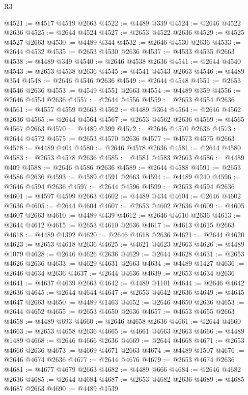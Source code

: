 \begin{lexlean}{R3}
\begin{coremodule}
@4521 := @4517 @4519 @2663
@4522 := @4489 @339
@4524 := @2646 @4522 @2636
@4525 := @2644 @4524
@4527 := @2653 @4522 @2636
@4529 := @4525 @4527 @2663
@4530 := @4489 @344
@4532 := @2646 @4530 @2636
@4533 := @2644 @4532
@4535 := @2653 @4530 @2636
@4537 := @4533 @4535 @2663
@4538 := @4489 @349
@4540 := @2646 @4538 @2636
@4541 := @2644 @4540
@4543 := @2653 @4538 @2636
@4545 := @4541 @4543 @2663
@4546 := @4489 @354
@4548 := @2646 @4546 @2636
@4549 := @2644 @4548
@4551 := @2653 @4546 @2636
@4553 := @4549 @4551 @2663
@4554 := @4489 @359
@4556 := @2646 @4554 @2636
@4557 := @2644 @4556
@4559 := @2653 @4554 @2636
@4561 := @4557 @4559 @2663
@4562 := @4489 @364
@4564 := @2646 @4562 @2636
@4565 := @2644 @4564
@4567 := @2653 @4562 @2636
@4569 := @4565 @4567 @2663
@4570 := @4489 @399
@4572 := @2646 @4570 @2636
@4573 := @2644 @4572
@4575 := @2653 @4570 @2636
@4577 := @4573 @4575 @2663
@4578 := @4489 @404
@4580 := @2646 @4578 @2636
@4581 := @2644 @4580
@4583 := @2653 @4578 @2636
@4585 := @4581 @4583 @2663
@4586 := @4489 @409
@4588 := @2646 @4586 @2636
@4589 := @2644 @4588
@4591 := @2653 @4586 @2636
@4593 := @4589 @4591 @2663
@4594 := @4489 @240
@4596 := @2646 @4594 @2636
@4597 := @2644 @4596
@4599 := @2653 @4594 @2636
@4601 := @4597 @4599 @2663
@4602 := @4489 @434
@4604 := @2646 @4602 @2636
@4605 := @2644 @4604
@4607 := @2653 @4602 @2636
@4609 := @4605 @4607 @2663
@4610 := @4489 @439
@4612 := @2646 @4610 @2636
@4613 := @2644 @4612
@4615 := @2653 @4610 @2636
@4617 := @4613 @4615 @2663
@4618 := @4489 @1392
@4620 := @2646 @4618 @2636
@4621 := @2644 @4620
@4623 := @2653 @4618 @2636
@4625 := @4621 @4623 @2663
@4626 := @4489 @1079
@4628 := @2646 @4626 @2636
@4629 := @2644 @4628
@4631 := @2653 @4626 @2636
@4633 := @4629 @4631 @2663
@4634 := @4489 @1427
@4636 := @2646 @4634 @2636
@4637 := @2644 @4636
@4639 := @2653 @4634 @2636
@4641 := @4637 @4639 @2663
@4642 := @4489 @1101
@4644 := @2646 @4642 @2636
@4645 := @2644 @4644
@4647 := @2653 @4642 @2636
@4649 := @4645 @4647 @2663
@4650 := @4489 @1463
@4652 := @2646 @4650 @2636
@4653 := @2644 @4652
@4655 := @2653 @4650 @2636
@4657 := @4653 @4655 @2663
@4658 := @4489 @693
@4660 := @2646 @4658 @2636
@4661 := @2644 @4660
@4663 := @2653 @4658 @2636
@4665 := @4661 @4663 @2663
@4666 := @4489 @1489
@4668 := @2646 @4666 @2636
@4669 := @2644 @4668
@4671 := @2653 @4666 @2636
@4673 := @4669 @4671 @2663
@4674 := @4489 @1507
@4676 := @2646 @4674 @2636
@4677 := @2644 @4676
@4679 := @2653 @4674 @2636
@4681 := @4677 @4679 @2663
@4682 := @4489 @666
@4684 := @2646 @4682 @2636
@4685 := @2644 @4684
@4687 := @2653 @4682 @2636
@4689 := @4685 @4687 @2663
@4690 := @4489 @1539

\end{coremodule}
\end{lexlean}
